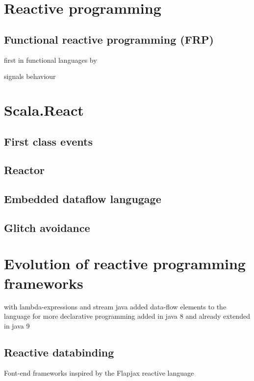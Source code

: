 \documentclass[acmsmall]{acmart}\settopmatter{printfolios=true,printccs=false,printacmref=false}
\begin{document}
\section{Reactive programming}

	\subsection{Functional reactive programming (FRP)}

		first in functional languages by~\cite{Elliott}

		signals behaviour~\cite{Bainomugisha:2013}
	

\section{Scala.React}

	\subsection{First class events}

	\subsection{Reactor}

	\subsection{Embedded dataflow langugage}

	\subsection{Glitch avoidance}

\section{Evolution of reactive programming frameworks}

	with lambda-expressions and stream java added data-flow elements to the language for more declarative programming
	added in java 8 and already extended in java 9

	\subsection{Reactive databinding}

		Font-end frameworks inspired by the Flapjax reactive language~\cite{Meyerovich:2009}
\end{document}
